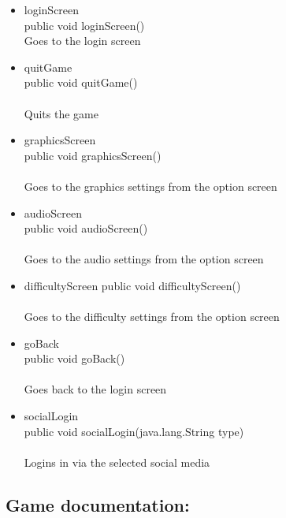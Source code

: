 \documentclass[letterpaper]{article}
\begin{document}
\begin{itemize}
\begin{itemize}
										\item	loginScreen \\
												public void loginScreen() \\
												Goes to the login screen
										\item	quitGame \\
												public void quitGame() \\ \\
												Quits the game
										\item	graphicsScreen \\
												public void graphicsScreen() \\ \\
												Goes to the graphics settings from the option screen
										\item	audioScreen \\
												public void audioScreen() \\ \\
												Goes to the audio settings from the option screen
										\item	difficultyScreen
												public void difficultyScreen() \\ \\
												Goes to the difficulty settings from the option screen
										\item	goBack \\
												public void goBack() \\ \\
												Goes back to the login screen
										\item	socialLogin \\
												public void socialLogin(java.lang.String type) \\ \\
												Logins in via the selected social media
									\end{itemize}
						\end{itemize}
						
					\vspace{0.2in}
					\subsection*{Game documentation:}
					\vspace{0.1in}
					
\end{document}
